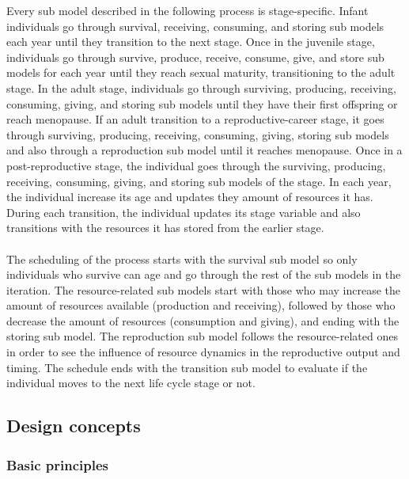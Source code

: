 \documentclass{article}
\begin{document}
Every sub model described in the following process is stage-specific. Infant individuals go through survival, receiving, consuming, and storing sub models each year until they transition to the next stage. Once in the juvenile stage, individuals go through survive, produce, receive, consume, give, and store sub models for each year until they reach sexual maturity, transitioning to the adult stage. In the adult stage, individuals go through surviving, producing, receiving, consuming, giving, and storing sub models until they have their first offspring or reach menopause. If an adult transition to a reproductive-career stage, it goes through surviving, producing, receiving, consuming, giving, storing sub models and also through a reproduction sub model until it reaches menopause. Once in a post-reproductive stage, the individual goes through the surviving, producing, receiving, consuming, giving, and storing sub models of the stage. In each year, the individual increase its age and updates they amount of resources it has. During each transition, the individual updates its stage variable and also transitions with the resources it has stored from the earlier stage.
\\\\
The scheduling of the process starts with the survival sub model so only individuals who survive can age and go through the rest of the sub models in the iteration. The resource-related sub models start with those who may increase the amount of resources available (production and receiving), followed by those who decrease the amount of resources (consumption and giving), and ending with the storing sub model. The reproduction sub model follows the resource-related ones in order to see the influence of resource dynamics in the reproductive output and timing. The schedule ends with the transition sub model to evaluate if the individual moves to the next life cycle stage or not.

\subsection{Design concepts}

\subsubsection{Basic principles}
\end{document}
